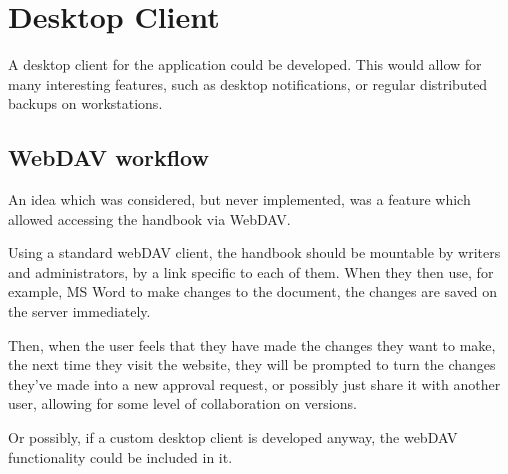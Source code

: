 \documentclass[../../master.tex]{subfiles}
\begin{document}
\section{Desktop Client}
A desktop client for the application could be developed. This would allow for many interesting features, such as desktop notifications, or regular distributed backups on workstations.
\subsection{WebDAV workflow}
An idea which was considered, but never implemented, was a feature which allowed accessing the handbook via WebDAV.

Using a standard webDAV client, the handbook should be mountable by writers and administrators, by a link specific to each of them. When they then use, for example, MS Word to make changes to the document, the changes are saved on the server immediately.

Then, when the user feels that they have made the changes they want to make, the next time they visit the website, they will be prompted to turn the changes they've made into a new approval request, or possibly just share it with another user, allowing for some level of collaboration on versions.

Or possibly, if a custom desktop client is developed anyway, the webDAV functionality could be included in it.
\end{document}
